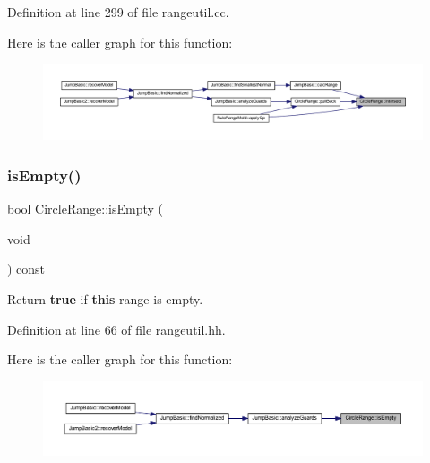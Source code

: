 Definition at line 299 of file rangeutil.\+cc.

Here is the caller graph for this function\+:
\nopagebreak
\begin{figure}[H]
\begin{center}
\leavevmode
\includegraphics[width=350pt]{class_circle_range_a9d8c4b0c9c8e9d51baa6eb2cbb551c6d_icgraph}
\end{center}
\end{figure}
\mbox{\label{class_circle_range_a2f1ae90649907ae47662da51137b363c}} 
\subsubsection{\texorpdfstring{isEmpty()}{isEmpty()}}
{\footnotesize\ttfamily bool Circle\+Range\+::is\+Empty (\begin{DoxyParamCaption}\item[{void}]{ }\end{DoxyParamCaption}) const\hspace{0.3cm}{\ttfamily [inline]}}



Return {\bfseries{true}} if {\bfseries{this}} range is empty. 



Definition at line 66 of file rangeutil.\+hh.

Here is the caller graph for this function\+:
\nopagebreak
\begin{figure}[H]
\begin{center}
\leavevmode
\includegraphics[width=350pt]{class_circle_range_a2f1ae90649907ae47662da51137b363c_icgraph}
\end{center}
\end{figure}
\mbox{\label{class_circle_range_a8b2b3063264a1169940c7131628b9a4b}} 
